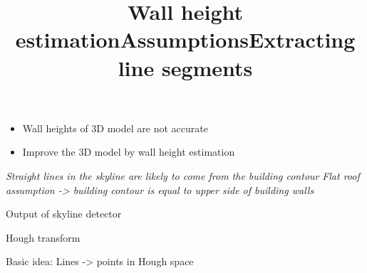 










\title{Wall height estimation}
\begin{itemize}
%
\item Wall heights of 3D model are not accurate
\item Improve the 3D model by wall height estimation
\end{itemize}

\title{Assumptions}
\emph{Straight lines in the skyline are likely to come from the building contour}
\emph{Flat roof assumption -> building contour is equal to upper side of building walls}

\title{Extracting line segments}
\item Output of skyline detector
\item Hough transform
\item Basic idea: Lines -> points in Hough space

